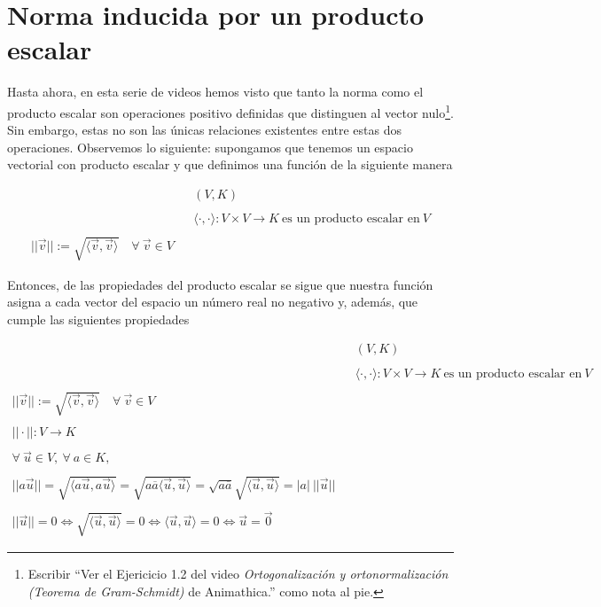 \documentclass[12pt,dvipsnames]{article}
\numberwithin{equation}{section}
\begin{document}

\section{Norma inducida por un producto escalar} %

Hasta ahora, en esta serie de videos hemos visto que tanto la norma como el producto escalar son operaciones positivo definidas que distinguen al vector nulo\footnote{Escribir ``Ver el Ejericicio 1.2 del video \emph{Ortogonalización y ortonormalización (Teorema de Gram-Schmidt)} de Animathica.'' como nota al pie.}. Sin embargo, estas no son las únicas relaciones existentes entre estas dos operaciones. Observemos lo siguiente: supongamos que tenemos un espacio vectorial con producto escalar y que definimos una función de la siguiente manera

\begin{align*}
    & &(V,K) \\
    \\
    & &\langle \cdot , \cdot \rangle : V\times V\to K \ \text{es un producto escalar en} \ V\\
    \\
    ||\vec{v}||:=\sqrt{\langle \vec{v} , \vec{v} \rangle} \quad \forall \ \vec{v}\in V
\end{align*}

Entonces, de las propiedades del producto escalar se sigue que nuestra función asigna a cada vector del espacio un número real no negativo y, además, que cumple las siguientes propiedades

\begin{align*}
    & &(V,K) \\
    \\
    & &\langle \cdot , \cdot \rangle : V\times V\to K \ \text{es un producto escalar en} \ V\\
    \\
    ||\vec{v}||:=\sqrt{\langle \vec{v} , \vec{v} \rangle} \quad \forall \ \vec{v}\in V\\
    \\
    ||\cdot||:V\to K\\
    \\
    \forall \ \vec{u}\in V, \ \forall \ a\in K,\\
    \\
    ||a\vec{u}|| = \sqrt{\langle a\vec{u} , a\vec{u} \rangle} = \sqrt{a\overline{a}\langle \vec{u} , \vec{u} \rangle} = \sqrt{a\overline{a}} \sqrt{\langle \vec{u} , \vec{u} \rangle} = |a| \ ||\vec{u}||\\
    \\
    ||\vec{u}|| = 0 \iff \sqrt{\langle \vec{u} , \vec{u} \rangle} = 0 \iff \langle \vec{u} , \vec{u} \rangle = 0 \iff \vec{u} = \vec{0}
\end{align*}
\end{document}
